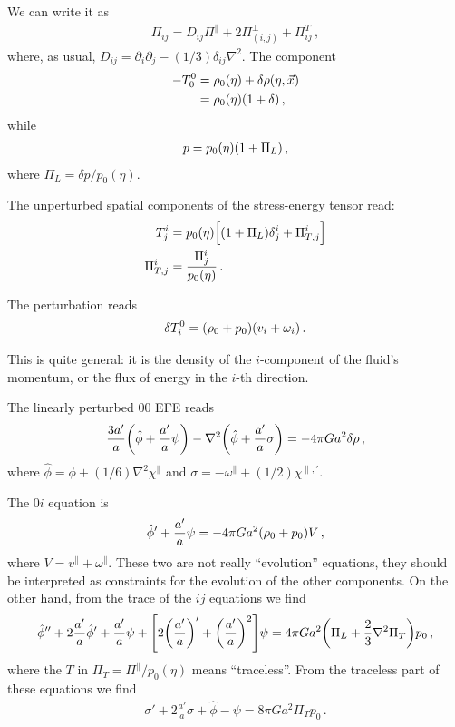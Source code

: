 \documentclass[main.tex]{subfiles}
\begin{document}
We can write it as 
%
\begin{align}
\Pi_{ij} = D_{ij} \Pi^{\parallel} + 2\Pi^{\perp}_{(i, j)} + \Pi^{T}_{ij}
\,,
\end{align}
%
where, as usual, \(D_{ij} = \partial_{i} \partial_{j} - (1/3) \delta_{ij} \nabla^2\). 
The component 
%
\begin{align}
- T^{0}_{0} &= \rho_{0} (\eta ) + \delta \rho (\eta , \vec{x})  \\
&= \rho_0 (\eta ) \qty(1 + \delta ) 
\,,
\end{align}
%
while 
%
\begin{align}
p = p_0 (\eta ) \qty(1 + \Pi _L) 
\,,
\end{align}
%
where \(\Pi _L = \delta p / p_0 (\eta )\). 

The unperturbed spatial components of the stress-energy tensor read:
%
\begin{align}
T^{i}_{j} &= p_0 (\eta ) \qty[ \qty(1 + \Pi _L) \delta^{i}_{j} + \Pi_{T, j}^{i}]  \\
\Pi_{T, j}^{i} &= \frac{\Pi^{i}_{j}}{p_0 (\eta )}
\,.
\end{align}

The perturbation reads 
%
\begin{align}
\delta T^{0}_{i} = \qty(\rho_0 + p_0 ) \qty(v_i + \omega _i )
\,.
\end{align}

This is quite general: it is the density of the \(i\)-component of the fluid's momentum, or the flux of energy in the \(i\)-th direction.

The linearly perturbed \(00\) EFE reads 
%
\begin{align}
\frac{3 a'}{a} \qty(\hat{\phi} + \frac{a'}{a} \psi ) - \nabla^2 \qty(\hat{\phi} + \frac{a'}{a} \sigma ) = - 4 \pi G a^2 \delta \rho 
\,,
\end{align}
%
where \(\hat{\phi} = \phi + (1/6) \nabla^2 \chi^{\parallel}\) and \(\sigma = - \omega^{\parallel} + (1/2) \chi^{\parallel, \prime}\). 

The \(0i\) equation is 
%
\begin{align}
\hat{\phi}' + \frac{a'}{a} \psi = - 4 \pi G a^2 \qty(\rho_0 + p_0 )V
\,,
\end{align}
%
where \(V = v^{\parallel} + \omega^{\parallel}\). 
These two are not really ``evolution'' equations, they should be interpreted as constraints for the evolution of the other components. 
On the other hand, from the trace of the \(ij\) equations we find 
%
\begin{align}
\hat{\phi}'' + 2 \frac{a'}{a} \hat{\phi}' + \frac{a'}{a} \psi +
\qty[2 \qty(\frac{a'}{a})' + \qty(\frac{a'}{a})^2] \psi 
= 4 \pi G a^2 \qty(\Pi _L + \frac{2}{3} \nabla^2 \Pi _T)p_0 
\,,
\end{align}
%
where the \(T\) in \(\Pi _T = \Pi^{\parallel} / p_0 (\eta )\) means ``traceless''. 
From the traceless part of these equations we find 
%
\begin{align}
\sigma ' + 2 \frac{a'}{a} \sigma + \hat{\phi} - \psi = 8 \pi G a^2 \Pi _T p_0 
\,.
\end{align}
\end{document}
